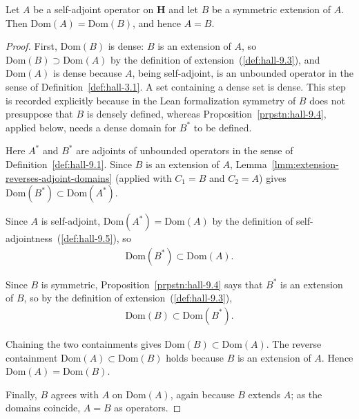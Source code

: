 \begin{lemma}
    \label{lmm:self-adjoint-maximally-symmetric}
    \leanok
    Let $A$ be a self-adjoint operator on $\mathbf{H}$ and let $B$ be a symmetric extension of $A$. Then $\text{Dom}(A) = \text{Dom}(B)$, and hence $A = B$.
\end{lemma}
\begin{proof}
    \leanok
First, $\text{Dom}(B)$ is dense: $B$ is an extension of $A$, so $\text{Dom}(B) \supset \text{Dom}(A)$ by the definition of extension~(\ref{def:hall-9.3}), and $\text{Dom}(A)$ is dense because $A$, being self-adjoint, is an unbounded operator in the sense of Definition~\ref{def:hall-3.1}. A set containing a dense set is dense. This step is recorded explicitly because in the Lean formalization symmetry of $B$ does not presuppose that $B$ is densely defined, whereas Proposition~\ref{prpstn:hall-9.4}, applied below, needs a dense domain for $B^*$ to be defined.

Here $A^*$ and $B^*$ are adjoints of unbounded operators in the sense of Definition~\ref{def:hall-9.1}. Since $B$ is an extension of $A$, Lemma~\ref{lmm:extension-reverses-adjoint-domains} (applied with $C_1 = B$ and $C_2 = A$) gives $\text{Dom}(B^*) \subset \text{Dom}(A^*)$.

Since $A$ is self-adjoint, $\text{Dom}(A^*) = \text{Dom}(A)$ by the definition of self-adjointness~(\ref{def:hall-9.5}), so
\begin{align}
    \text{Dom}(B^*) \subset \text{Dom}(A).
\end{align}

Since $B$ is symmetric, Proposition~\ref{prpstn:hall-9.4} says that $B^*$ is an extension of $B$, so by the definition of extension~(\ref{def:hall-9.3}),
\begin{align}
    \text{Dom}(B) \subset \text{Dom}(B^*).
\end{align}

Chaining the two containments gives $\text{Dom}(B) \subset \text{Dom}(A)$. The reverse containment $\text{Dom}(A) \subset \text{Dom}(B)$ holds because $B$ is an extension of $A$. Hence $\text{Dom}(A) = \text{Dom}(B)$.

Finally, $B$ agrees with $A$ on $\text{Dom}(A)$, again because $B$ extends $A$; as the domains coincide, $A = B$ as operators.
\end{proof}

